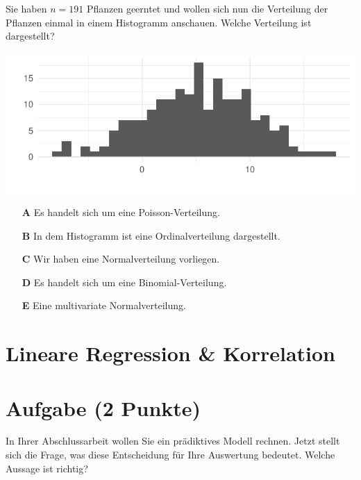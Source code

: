 \documentclass[a4paper, 9pt]{scrartcl}\usepackage[]{graphicx}\usepackage[]{xcolor}
\makeatletter
\def\maxwidth{ %
  \ifdim\Gin@nat@width>\linewidth
    \linewidth
  \else
    \Gin@nat@width
  \fi
}
\makeatother
\begin{document}
Sie haben $n = 191$ Pflanzen geerntet und wollen sich nun die Verteilung der Pflanzen einmal in einem Histogramm anschauen. Welche Verteilung ist dargestellt?



{\centering \includegraphics[width=\maxwidth]{img/mc-distribution-02-a-1} 

}







\begin{enumerate}
\item [\textbf{A} \msquare] Es handelt sich um eine Poisson-Verteilung.
\item [\textbf{B} \msquare] In dem Histogramm ist eine Ordinalverteilung dargestellt.
\item [\textbf{C} \msquare] Wir haben eine Normalverteilung vorliegen.
\item [\textbf{D} \msquare] Es handelt sich um eine Binomial-Verteilung.
\item [\textbf{E} \msquare] Eine multivariate Normalverteilung.
\end{enumerate} 
\section*{Lineare Regression \& Korrelation}

\section{Aufgabe \hfill (2 Punkte)}



In Ihrer Abschlussarbeit wollen Sie ein prädiktives Modell rechnen. Jetzt stellt sich die Frage, was diese Entscheidung für Ihre Auswertung bedeutet. Welche Aussage ist richtig?
\end{document}
